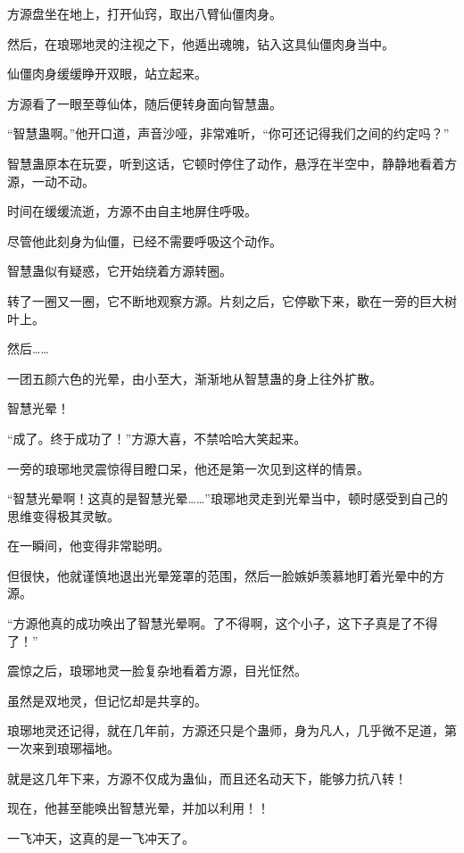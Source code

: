 
\begin{this_body}

方源盘坐在地上，打开仙窍，取出八臂仙僵肉身。

然后，在琅琊地灵的注视之下，他遁出魂魄，钻入这具仙僵肉身当中。

仙僵肉身缓缓睁开双眼，站立起来。

方源看了一眼至尊仙体，随后便转身面向智慧蛊。

“智慧蛊啊。”他开口道，声音沙哑，非常难听，“你可还记得我们之间的约定吗？”

智慧蛊原本在玩耍，听到这话，它顿时停住了动作，悬浮在半空中，静静地看着方源，一动不动。

时间在缓缓流逝，方源不由自主地屏住呼吸。

尽管他此刻身为仙僵，已经不需要呼吸这个动作。

智慧蛊似有疑惑，它开始绕着方源转圈。

转了一圈又一圈，它不断地观察方源。片刻之后，它停歇下来，歇在一旁的巨大树叶上。

然后……

一团五颜六色的光晕，由小至大，渐渐地从智慧蛊的身上往外扩散。

智慧光晕！

“成了。终于成功了！”方源大喜，不禁哈哈大笑起来。

一旁的琅琊地灵震惊得目瞪口呆，他还是第一次见到这样的情景。

“智慧光晕啊！这真的是智慧光晕……”琅琊地灵走到光晕当中，顿时感受到自己的思维变得极其灵敏。

在一瞬间，他变得非常聪明。

但很快，他就谨慎地退出光晕笼罩的范围，然后一脸嫉妒羡慕地盯着光晕中的方源。

“方源他真的成功唤出了智慧光晕啊。了不得啊，这个小子，这下子真是了不得了！”

震惊之后，琅琊地灵一脸复杂地看着方源，目光怔然。

虽然是双地灵，但记忆却是共享的。

琅琊地灵还记得，就在几年前，方源还只是个蛊师，身为凡人，几乎微不足道，第一次来到琅琊福地。

就是这几年下来，方源不仅成为蛊仙，而且还名动天下，能够力抗八转！

现在，他甚至能唤出智慧光晕，并加以利用！！

一飞冲天，这真的是一飞冲天了。


\end{this_body}

